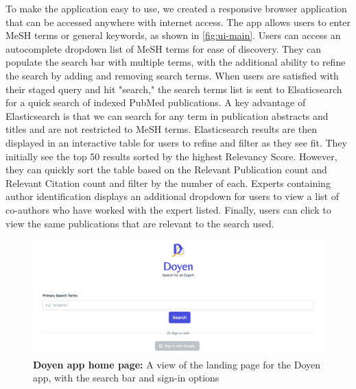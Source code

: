 To make the application easy to use, we created a responsive browser application that can be accessed anywhere with internet access. The app allows users to enter MeSH terms or general keywords, as shown in \autoref{fig:ui-main}. Users can access an autocomplete dropdown list of MeSH terms for ease of discovery. They can populate the search bar with multiple terms, with the additional ability to refine the search by adding and removing search terms. When users are satisfied with their staged query and hit "search," the search terms list is sent to Elsaticsearch for a quick search of indexed PubMed publications. A key advantage of Elasticsearch is that we can search for any term in publication abstracts and titles and are not restricted to MeSH terms. Elasticsearch results are then displayed in an interactive table for users to refine and filter as they see fit. They initially see the top 50 results sorted by the highest Relevancy Score. However, they can quickly sort the table based on the Relevant Publication count and Relevant Citation count and filter by the number of each. Experts containing author identification displays an additional dropdown for users to view a list of co-authors who have worked with the expert listed. Finally, users can click to view the same publications that are relevant to the search used.

\begin{figure}[ht!]
    \tiny
    \centering
    \includegraphics[width=\figwidth]{Images/ui-main.png}
    \caption[Doyen app home page]{\textbf{Doyen app home page:} A view of the landing page for the Doyen app, with the search bar and sign-in options}
    \label{fig:ui-main}
\end{figure}

